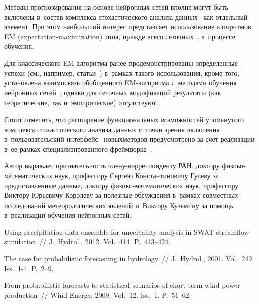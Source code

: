 \begin{multicols}{2}
Методы прогнозирования на основе нейронных сетей вполне могут быть включены
в~состав комплекса стохастического анализа
данных~\cite{Gorshenin2015,Gorshenin2017d} как отдельный элемент. При этом
наибольший интерес представляет использование алгоритмов EM (expectation-maximization)
ти\-па, прежде
всего сеточных~\cite{Gorshenin2013a,Gorshenin2013b}, в~процессе обучения. 

Для
классического EM-ал\-го\-рит\-ма ранее продемонстрированы определенные успехи
(см., например, статьи~\cite{Freitas2000,Ng2004}) в~рамках такого использования,
кроме того, установлена взаимосвязь обобщенного EM-ал\-го\-рит\-ма с~методами
обуче\-ния нейронных сетей~\cite{Audhkhasi2016}, однако для сеточных
модификаций результаты (как теоретические, так и~эмпирические) отсутствуют.

Стоит отметить, что расширение функциональных возможностей упомянутого
комплекса стохастического анализа данных с~точки зрения включения 
в~пользовательский интерфейс~\cite{Gorshenin2016} новых\linebreak методов предусмотрено
за счет реализации в~ее рамках специализированного
фреймворка~\cite{Gorshenin2017Soft}.

\smallskip

{Автор выражает признательность чле\-ну-кор\-рес\-пон\-ден\-ту РАН, доктору
фи\-зи\-ко-ма\-те\-ма\-ти\-че\-ских наук,
профессору Сергею Константиновичу Гулеву за предоставленные данные,
доктору
фи\-зи\-ко-ма\-те\-ма\-ти\-че\-ских наук, профессору Виктору Юрьевичу Королеву за полезные обсуждения 
в~рамках совместных исследований метеорологических явлений и~Виктору Кузьмину
за помощь в~реализации обучения нейронных сетей.}

\vspace*{-4pt}

{\small\frenchspacing
 {%
 \begin{thebibliography}{99}
 Using precipitation data ensemble for uncertainty analysis in SWAT
streamflow simulation~// J.~Hydrol., 2012. Vol.~414. P.~413--424.

 The case for probabilistic
forecasting in hydrology~// J.~Hydrol., 2001. Vol.~249. Iss.~1-4. P.~2--9.

 From probabilistic forecasts to statistical scenarios of short-term wind
power production~// Wind Energy, 2009. Vol.~12. Iss.~1. P.~51--62.


\end{thebibliography}}}
\end{multicols}
